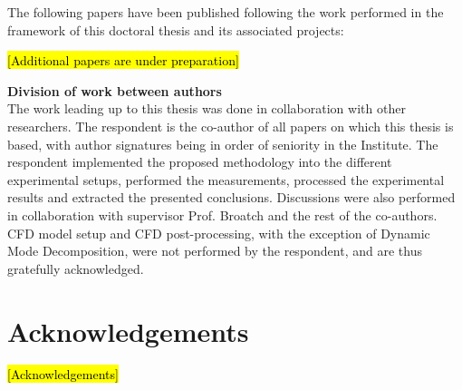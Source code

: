 \documentclass[final,twoside,11pt]{book}
\makeatletter
\numberwithin{equation}{section}
\numberwithin{figure}{chapter}
\numberwithin{table}{chapter}
\def\cleardoublepage{\clearpage\if@twoside \ifodd\c@page\else
  \hbox{}
  \thispagestyle{empty}
  \newpage
  \if@twocolumn\hbox{}\newpage\fi\fi\fi}
\makeatother
\begin{document}
The following papers have been published following the work performed in the framework of this doctoral thesis and its associated projects:

\renewcommand*{\bibfont}{\small}
\renewcommand*{\mkbibacro}[1]{#1}
\begingroup
{}
\nocite{broatch2014methodology,broatch2015simulations,torregrosa2014aco,broatch2016numerical,torregrosa2016experimental}
\printbibliography[keyword=MyOwn,heading=none]
\endgroup

\hl{[Additional papers are under preparation]}

\newpage

{\bfseries\sffamily\Large\noindent Division of work between authors}\\[-1mm]

The work leading up to this thesis was done in collaboration with other researchers. The respondent is the co-author of all papers on which
this thesis is based, with author signatures being in order of seniority in the Institute. The respondent implemented the proposed methodology into the different experimental setups, performed the measurements, processed the experimental results and extracted the presented conclusions. Discussions were also performed in collaboration with supervisor Prof. Broatch and the rest of the co-authors. CFD model setup and CFD post-processing, with the exception of Dynamic Mode Decomposition, were not performed by the respondent, and are thus gratefully acknowledged.

\cleardoublepage

\chapter*{Acknowledgements}
\hl{[Acknowledgements]}
\cleardoublepage

\null\vspace{2cm}
\end{document}
